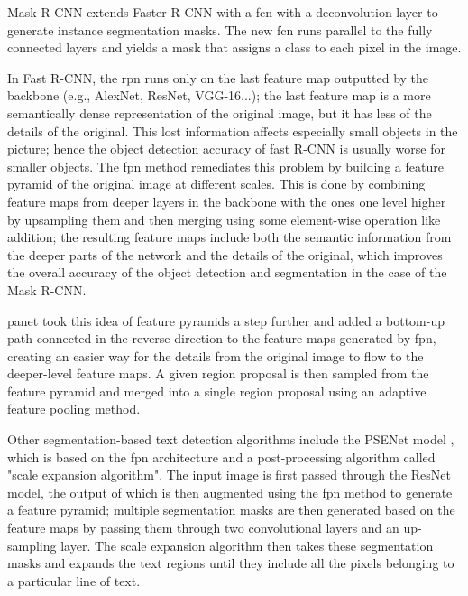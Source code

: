 \label{maskrcnn}Mask R-CNN \cite{he_mask_2017} extends Faster R-CNN with a \gls{fcn} with a deconvolution layer to generate instance segmentation masks. The new \gls{fcn} runs parallel to the fully connected layers and yields a mask that assigns a class to each pixel in the image.

In Fast R-CNN, the \gls{rpn} runs only on the last feature map outputted by the backbone (e.g., AlexNet, ResNet, VGG-16...); the last feature map is a more semantically dense representation of the original image, but it has less of the details of the original. This lost information affects especially small objects in the picture; hence the object detection accuracy of fast R-CNN is usually worse for smaller objects. The \gls{fpn} method \cite{lin_feature_2017} remediates this problem by building a feature pyramid of the original image at different scales. This is done by combining feature maps from deeper layers in the backbone with the ones one level higher by upsampling them and then merging using some element-wise operation like addition; the resulting feature maps include both the semantic information from the deeper parts of the network and the details of the original, which improves the overall accuracy of the object detection and segmentation in the case of the Mask R-CNN.

\label{panet}\gls{panet} \cite{liu_path_2018} took this idea of feature pyramids a step further and added a bottom-up path connected in the reverse direction to the feature maps generated by \gls{fpn}, creating an easier way for the details from the original image to flow to the deeper-level feature maps. A given region proposal is then sampled from the feature pyramid and merged into a single region proposal using an adaptive feature pooling method.

\label{psenet}Other segmentation-based text detection algorithms include the PSENet model \cite{wang_shape_2019}, which is based on the \gls{fpn} architecture and a post-processing algorithm called "scale expansion algorithm". The input image is first passed through the ResNet model, the output of which is then augmented using the \gls{fpn} method to generate a feature pyramid; multiple segmentation masks are then generated based on the feature maps by passing them through two convolutional layers and an up-sampling layer. The scale expansion algorithm then takes these segmentation masks and expands the text regions until they include all the pixels belonging to a particular line of text.


